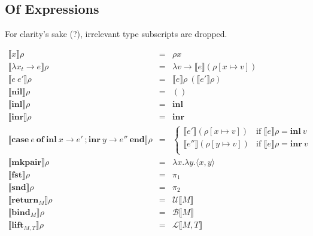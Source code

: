 \documentclass{article}[11pt]
\begin{document}
\subsection{Of Expressions}
For clarity's sake (?), irrelevant type subscripts are dropped.

\begin{eqnarray*}
\llbracket{}x\rrbracket{}\rho &=& \rho x\\
\llbracket{}\lambda x_t \rightarrow e\rrbracket \rho &=& \lambda v \rightarrow \llbracket{}e\rrbracket(\rho[x\mapsto{}v])\\
\llbracket{}e~ e'\rrbracket \rho &=& \llbracket{}e\rrbracket\rho~ (\llbracket{}e'\rrbracket\rho)\\
\llbracket{}\mathbf{nil}\rrbracket \rho &=& ()\\
\llbracket{}\mathbf{inl}\rrbracket \rho &=& \mathbf{inl}\\
\llbracket{}\mathbf{inr}\rrbracket \rho &=& \mathbf{inr}\\
\llbracket{}\mathbf{case}~ e~ \mathbf{of}~ \mathbf{inl}~ x \rightarrow e' ~; \mathbf{inr}~ y \rightarrow e''~ \mathbf{end}\rrbracket \rho &=& \begin{cases}
                                                                                                                                 \llbracket e' \rrbracket (\rho[x\mapsto{}v])&\text{if } \llbracket e \rrbracket \rho = \mathbf{inl}~ v\\
                                                                                                                                 \llbracket e'' \rrbracket (\rho[y\mapsto{}v])&\text{if } \llbracket e \rrbracket \rho = \mathbf{inr}~ v\\
                                                                                                                                \end{cases}\\
\llbracket{}\mathbf{mkpair}\rrbracket{}\rho &=& \lambda x . \lambda y . \langle x,y \rangle\\
\llbracket{}\mathbf{fst}\rrbracket\rho &=& \pi_1\\
\llbracket{}\mathbf{snd}\rrbracket\rho &=& \pi_2\\
\llbracket{}\mathbf{return}_M\rrbracket{}\rho &=& \mathcal{U}\llbracket{}M\rrbracket\\
\llbracket{}\mathbf{bind}_M\rrbracket{}\rho &=& \mathcal{B}\llbracket{}M\rrbracket\\
\llbracket{}\mathbf{lift}_{M,T}\rrbracket\rho &=& \mathcal{L}\llbracket{}M,T\rrbracket\\

\end{eqnarray*}
\end{document}
